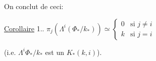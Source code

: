 On conclut de ceci:

\uline{Corollaire} 1.. \quad $\pi_j(\Lambda^i(\Phi_*/k_*))\simeq\begin{cases}0&\text{si }j\ne i\\k&\text{si }j=i\end{cases}$

(i.e. $\Lambda^i\Phi_*/k_*$ est un $K_*(k,i)$).


